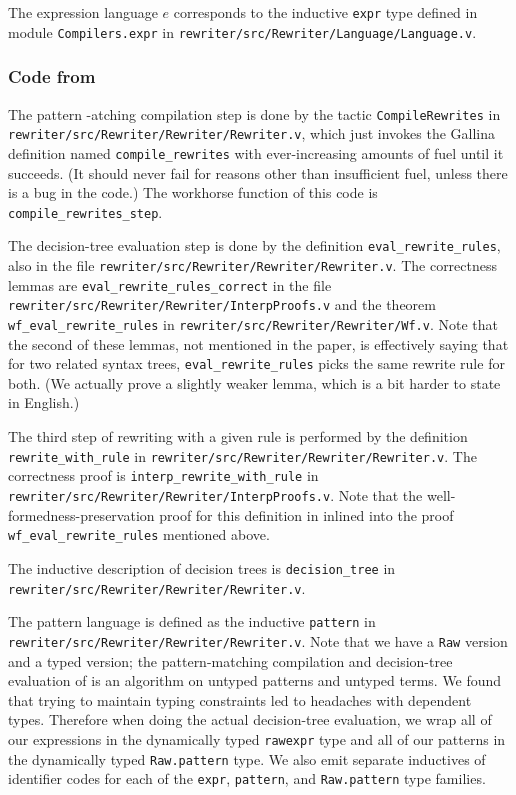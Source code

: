 \documentclass[sigplan,10pt,review,anonymous]{acmart}\settopmatter{printfolios=true,printccs=false,printacmref=false}
\begin{document}
The expression language $e$ corresponds to the inductive \texttt{expr} type defined in module \texttt{Compilers.expr} in \texttt{rewriter/src/Rewriter/Language/Language.v}.

\subsubsection{Code from }

The pattern -atching compilation step is done by the tactic \texttt{CompileRewrites} in \texttt{rewriter/src/Rewriter/Rewriter/Rewriter.v}, which just invokes the Gallina definition named \texttt{compile\_rewrites} with ever-increasing amounts of fuel until it succeeds.
(It should never fail for reasons other than insufficient fuel, unless there is a bug in the code.)
The workhorse function of this code is \texttt{compile\_rewrites\_step}.

The decision-tree evaluation step is done by the definition \texttt{eval\_rewrite\_rules}, also in the file \texttt{rewriter/src/Rewriter/Rewriter/Rewriter.v}.
The correctness lemmas are \texttt{eval\_rewrite\_rules\_correct} in the file \texttt{rewriter/src/Rewriter/Rewriter/InterpProofs.v} and the theorem \texttt{wf\_eval\_rewrite\_rules} in \texttt{rewriter/src/Rewriter/Rewriter/Wf.v}.
Note that the second of these lemmas, not mentioned in the paper, is effectively saying that for two related syntax trees, \texttt{eval\_rewrite\_rules} picks the same rewrite rule for both.
(We actually prove a slightly weaker lemma, which is a bit harder to state in English.)

The third step of rewriting with a given rule is performed by the definition \texttt{rewrite\_with\_rule} in \texttt{rewriter/src/Rewriter/Rewriter/Rewriter.v}.
The correctness proof is \texttt{interp\_rewrite\_with\_rule} in \texttt{rewriter/src/Rewriter/Rewriter/InterpProofs.v}.
Note that the well-formedness-preservation proof for this definition in inlined into the proof \verb|wf_eval_rewrite_rules| mentioned above.

The inductive description of decision trees is \verb|decision_tree| in \texttt{rewriter/src/Rewriter/Rewriter/Rewriter.v}.

The pattern language is defined as the inductive \verb|pattern| in \texttt{rewriter/src/Rewriter/Rewriter/Rewriter.v}.
Note that we have a \verb|Raw| version and a typed version; the pattern-matching compilation and decision-tree evaluation of \citet{Aehlig} is an algorithm on untyped patterns and untyped terms.
We found that trying to maintain typing constraints led to headaches with dependent types.
Therefore when doing the actual decision-tree evaluation, we wrap all of our expressions in the dynamically typed \verb|rawexpr| type and all of our patterns in the dynamically typed \verb|Raw.pattern| type.
We also emit separate inductives of identifier codes for each of the \verb|expr|, \verb|pattern|, and \verb|Raw.pattern| type families.
\end{document}

